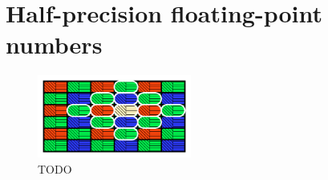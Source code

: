 \section{Half-precision floating-point numbers}





\begin{figure}[H]
    \centering
    \includegraphics[width=0.45\textwidth]{figures/polarized_image/half2_conv.pdf}
    \caption{TODO}
    \label{fig:}
\end{figure}